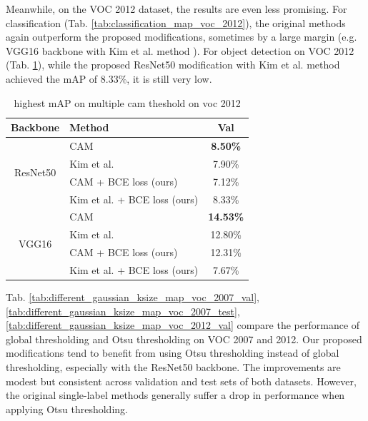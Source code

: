 \documentclass[conference]{IEEEtran}
\begin{document}
Meanwhile, on the VOC 2012 dataset, the results are even less promising. For classification (Tab. \ref{tab:classification_map_voc_2012}), the original methods again outperform the proposed modifications, sometimes by a large margin (e.g. VGG16 backbone with Kim et al. method \cite{kim2022bridging}). For object detection on VOC 2012 (Tab. \ref{tab:brute_force_cam_threshold_map_voc_2012}), while the proposed ResNet50 modification with Kim et al. method \cite{kim2022bridging} achieved the mAP of 8.33\%, it is still very low.


\begin{table}[t]
    \centering
    \caption{highest mAP on multiple cam theshold on voc 2012}
    \label{tab:brute_force_cam_threshold_map_voc_2012}
    \begin{tabular}{|c|l|c|}
        \hline
        Backbone                     & Method                                              & Val                             \\
        \hline
        \multirow[c]{4}{*}{ResNet50} & CAM\cite{zhou2015cnnlocalization}                   & \color{red} \bfseries{8.50\%}   \\
                                     & Kim et al. \cite{kim2022bridging}                   & 7.90\%                          \\
                                     & CAM\cite{zhou2015cnnlocalization} + BCE loss (ours) & 7.12\%                          \\
                                     & Kim et al. \cite{kim2022bridging} + BCE loss (ours) & 8.33\%                          \\
        \hline
        \multirow[c]{4}{*}{VGG16}    & CAM\cite{zhou2015cnnlocalization}                   & \color{blue} \bfseries{14.53\%} \\
                                     & Kim et al. \cite{kim2022bridging}                   & 12.80\%                         \\
                                     & CAM\cite{zhou2015cnnlocalization} + BCE loss (ours) & 12.31\%                         \\
                                     & Kim et al. \cite{kim2022bridging} + BCE loss (ours) & 7.67\%                          \\
        \hline
    \end{tabular}
\end{table}

Tab. \ref{tab:different_gaussian_ksize_map_voc_2007_val}, \ref{tab:different_gaussian_ksize_map_voc_2007_test}, \ref{tab:different_gaussian_ksize_map_voc_2012_val} compare the performance of global thresholding and Otsu thresholding on VOC 2007 and 2012. Our proposed modifications tend to benefit from using Otsu thresholding instead of global thresholding, especially with the ResNet50 backbone. The improvements are modest but consistent across validation and test sets of both datasets. However, the original single-label methods generally suffer a drop in performance when applying Otsu thresholding.
\end{document}
